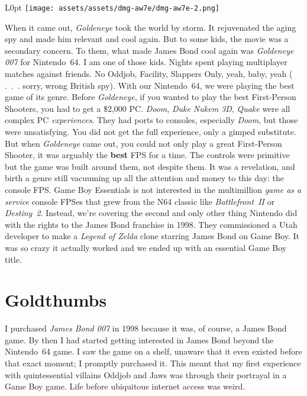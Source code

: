 \documentclass{book}
\begin{document}
\begin{wrapfigure}{L}{0pt} \texttt{[image: assets/assets/dmg-aw7e/dmg-aw7e-2.png]}\end{wrapfigure}
When it came out, \emph{Goldeneye} took the world by storm. It rejuvenated the aging spy and made him relevant and cool again. But to some kids, the movie was a secondary concern. To them, what made James Bond cool again was \emph{Goldeneye 007} for Nintendo 64. I am one of those kids. Nights spent playing multiplayer matches against friends. No Oddjob, Facility, Slappers Only, yeah, baby, yeah ( . . . sorry, wrong British spy). With our Nintendo 64, we were playing the best game of its genre. Before \emph{Goldeneye}, if you wanted to play the best First-Person Shooters, you had to get a \$2,000 PC. \emph{Doom}, \emph{Duke Nukem 3D}, \emph{Quake} were all complex PC \emph{experiences}. They had ports to consoles, especially \emph{Doom}, but those were unsatisfying. You did not get the full experience, only a gimped substitute. But when \emph{Goldeneye} came out, you could not only play a great First-Person Shooter, it was arguably the \textbf{best} FPS for a time. The controls were primitive but the game was built around them, not despite them. It was a revelation, and birth a genre still vacuuming up all the attention and money to this day: the console FPS. Game Boy Essentials is not interested in the multimillion \emph{game as a service} console FPSes that grew from the N64 classic like \emph{Battlefront II} or \emph{Destiny 2}. Instead, we’re covering the second and only other thing Nintendo did with the rights to the James Bond franchise in 1998. They commissioned a Utah developer to make a \emph{Legend of Zelda} clone starring James Bond on Game Boy. It was so crazy it actually worked and we ended up with an essential Game Boy title.

\FloatBarrier\needspace{10mm}\section*{Goldthumbs}\nopagebreak[4]

I purchased \emph{James Bond 007} in 1998 because it was, of course, a James Bond game. By then I had started getting interested in James Bond beyond the Nintendo 64 game. I saw the game on a shelf, unaware that it even existed before that exact moment; I promptly purchased it. This meant that my first experience with quintessential villains Oddjob and Jaws was through their portrayal in a Game Boy game. Life before ubiquitous internet access was weird.
\end{document}
